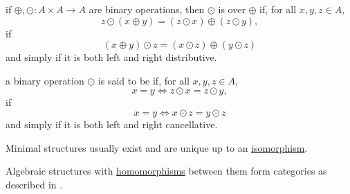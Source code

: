 \begin{definition}
\begin{defenum}
     if \( \oplus, \odot: A \times A \to A \) are binary operations, then \( \odot \) is  over \( \oplus \) if, for all \( x, y, z \in A \),
    \begin{equation*}
      z \odot (x \oplus y) = (z \odot x) \oplus (z \odot y),
    \end{equation*}
     if
    \begin{equation*}
      (x \oplus y) \odot z = (x \odot z) \oplus (y \odot z)
    \end{equation*}
    and simply  if it is both left and right distributive.

     a binary operation \( \odot \) is said to be  if, for all \( x, y, z \in A \),
    \begin{equation*}
      x = y \iff z \odot x = z \odot y,
    \end{equation*}
     if
    \begin{equation*}
      x = y \iff x \odot z = y \odot z
    \end{equation*}
    and simply  if it is both left and right cancellative.
  \end{defenum}

  Minimal structures usually exist and are unique up to an \hyperref[def:first_order_substructure]{isomorphism}.

  Algebraic structures with \hyperref[def:first_order_homomorphism]{homomorphisms} between them form categories as described in .
\end{definition}
